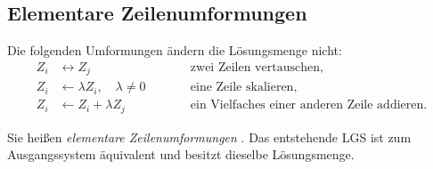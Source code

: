 \subsection{Elementare Zeilenumformungen}
\label{subsec:linear_systems_elementary_row_operations}

Die folgenden Umformungen ändern die Lösungsmenge nicht:
\[
  \begin{alignedat}{2}
    Z_i&\leftrightarrow Z_j
      &\qquad&\text{zwei Zeilen vertauschen},\\[0.45em]
    Z_i&\leftarrow \lambda Z_i,\quad \lambda\neq0
      &&\text{eine Zeile skalieren},\\[0.45em]
    Z_i&\leftarrow Z_i+\lambda Z_j
      &&\text{ein Vielfaches einer anderen Zeile addieren}.
  \end{alignedat}
\]

Sie heißen \emph{elementare Zeilenumformungen} . Das entstehende LGS ist zum Ausgangssystem äquivalent und besitzt
dieselbe Lösungsmenge.

